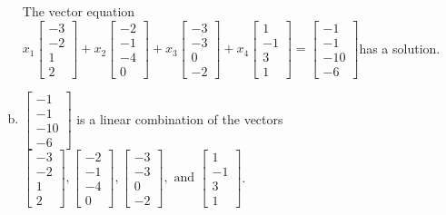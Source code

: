 \begin{exerciseAnswer}
\begin{enumerate}[(a)]
\begin{center}
\begin{minipage}{0.8\textwidth}
 The vector equation \( x_{1} \left[\begin{array}{c}
-3 \\
-2 \\
1 \\
2
\end{array}\right] + x_{2} \left[\begin{array}{c}
-2 \\
-1 \\
-4 \\
0
\end{array}\right] + x_{3} \left[\begin{array}{c}
-3 \\
-3 \\
0 \\
-2
\end{array}\right] + x_{4} \left[\begin{array}{c}
1 \\
-1 \\
3 \\
1
\end{array}\right] = \left[\begin{array}{c}
-1 \\
-1 \\
-10 \\
-6
\end{array}\right] \)has a solution.
\end{minipage}\end{center}
    
\item 

\( \left[\begin{array}{c}
-1 \\
-1 \\
-10 \\
-6
\end{array}\right] \) is a linear combination of the vectors \( \left[\begin{array}{c}
-3 \\
-2 \\
1 \\
2
\end{array}\right] , \left[\begin{array}{c}
-2 \\
-1 \\
-4 \\
0
\end{array}\right] , \left[\begin{array}{c}
-3 \\
-3 \\
0 \\
-2
\end{array}\right] , \text{ and } \left[\begin{array}{c}
1 \\
-1 \\
3 \\
1
\end{array}\right] \). 


\end{enumerate}
    
\end{exerciseAnswer}
    
